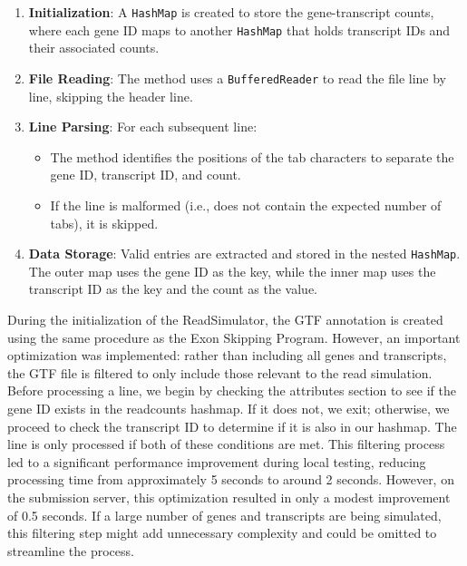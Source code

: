 \documentclass{article}
\begin{document}
    \begin{enumerate}
        \item \textbf{Initialization}: A \texttt{HashMap} is created to store the gene-transcript counts, where each gene ID maps to another \texttt{HashMap} that holds transcript IDs and their associated counts.

        \item \textbf{File Reading}: The method uses a \texttt{BufferedReader} to read the file line by line, skipping the header line.

        \item \textbf{Line Parsing}: For each subsequent line:
        \begin{itemize}
            \item The method identifies the positions of the tab characters to separate the gene ID, transcript ID, and count.
            \item If the line is malformed (i.e., does not contain the expected number of tabs), it is skipped.
        \end{itemize}

        \item \textbf{Data Storage}: Valid entries are extracted and stored in the nested \texttt{HashMap}. The outer map uses the gene ID as the key, while the inner map uses the transcript ID as the key and the count as the value.

    \end{enumerate}


    During the initialization of the ReadSimulator, the GTF annotation is created using the same procedure as the Exon Skipping Program. However, an important optimization was implemented: rather than including all genes and transcripts, the GTF file is filtered to only include those relevant to the read simulation. Before processing a line, we begin by checking the attributes section to see if the gene ID exists in the readcounts hashmap. If it does not, we exit; otherwise, we proceed to check the transcript ID to determine if it is also in our hashmap. The line is only processed if both of these conditions are met. This filtering process led to a significant performance improvement during local testing, reducing processing time from approximately 5 seconds to around 2 seconds. However, on the submission server, this optimization resulted in only a modest improvement of 0.5 seconds. If a large number of genes and transcripts are being simulated, this filtering step might add unnecessary complexity and could be omitted to streamline the process.
\end{document}
